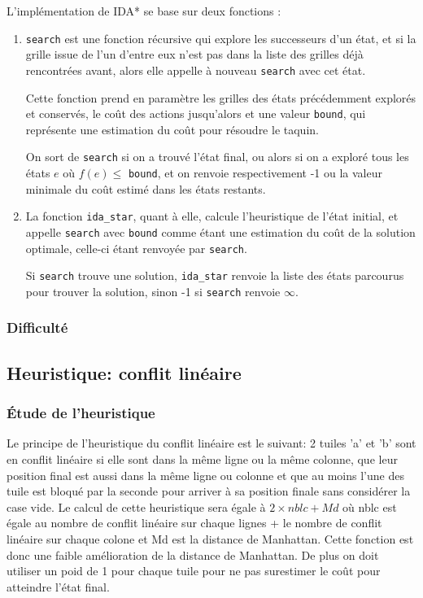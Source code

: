 \documentclass[a4paper, 12pt]{article}
\begin{document}
L'implémentation de IDA* se base sur deux fonctions :
\begin{enumerate}
    \item \lstinline{search} est une fonction récursive qui explore les successeurs d'un état, et si la grille issue de l'un d'entre eux n'est pas dans la liste des grilles déjà rencontrées avant, alors elle appelle à nouveau \lstinline{search} avec cet état.

          Cette fonction prend en paramètre les grilles des états précédemment explorés et conservés, le coût des actions jusqu'alors et une valeur \lstinline{bound}, qui représente une estimation du coût pour résoudre le taquin.

          On sort de \lstinline{search} si on a trouvé l'état final, ou alors si on a exploré tous les états $e$ où $f(e) \leq $ \lstinline{bound}, et on renvoie respectivement -1 ou la valeur minimale du coût estimé dans les états restants.

    \item La fonction \lstinline{ida_star}, quant à elle, calcule l'heuristique de l'état initial, et appelle \lstinline{search} avec \lstinline{bound} comme étant une estimation du coût de la solution optimale, celle-ci étant renvoyée par \lstinline{search}.

          Si \lstinline{search} trouve une solution, \lstinline{ida_star} renvoie la liste des états parcourus pour trouver la solution, sinon -1 si \lstinline{search} renvoie $\infty$.
\end{enumerate}

\subsubsection{Difficulté}

\subsection{Heuristique: conflit linéaire}


\subsubsection{Étude de l'heuristique}

Le principe de l'heuristique du conflit linéaire est le suivant: 2 tuiles 'a' et 'b' sont en conflit linéaire si elle sont dans la même ligne ou la même colonne, que leur position final est aussi dans la même ligne ou colonne et que au moins l'une des tuile est bloqué par la seconde pour arriver à sa position finale sans considérer la case vide.
Le calcul de cette heuristique sera égale à $2 \times nblc + Md$ où nblc est égale au nombre de conflit linéaire sur chaque lignes + le nombre de conflit linéaire sur chaque colone et Md est la distance de Manhattan. Cette fonction est donc une faible amélioration de la distance de Manhattan. De plus on doit utiliser un poid de 1 pour chaque tuile pour ne pas surestimer le coût pour atteindre l'état final.
\end{document}
